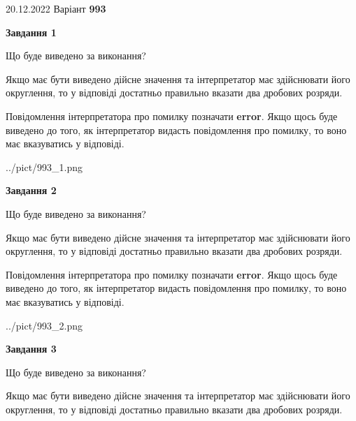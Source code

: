 \documentclass[12pt, ukrainian]{article}
\begin{document}
{20.12.2022 Варіант \No \textbf { 993 }\par}
{
\begin {Large}

{\begin {center}\textbf{Завдання 1}\end {center}}\par
Що буде виведено за виконання? \par

Якщо має бути виведено дійсне значення та інтерпретатор має здійснювати його округлення, 
то у відповіді достатньо правильно вказати два дробових розряди.

Повідомлення інтерпретатора про помилку позначати \textbf{error}.
Якщо щось буде виведено до того, як інтерпретатор видасть повідомлення про помилку, 
то воно має вказуватись у відповіді. \par

\begin{center}
	{../pict/993_1.png}
\end{center}
\newpage

{\begin {center}\textbf{Завдання 2}\end {center}}\par
Що буде виведено за виконання? \par

Якщо має бути виведено дійсне значення та інтерпретатор має здійснювати його округлення, 
то у відповіді достатньо правильно вказати два дробових розряди.

Повідомлення інтерпретатора про помилку позначати \textbf{error}.
Якщо щось буде виведено до того, як інтерпретатор видасть повідомлення про помилку, 
то воно має вказуватись у відповіді. \par

\begin{center}
	{../pict/993_2.png}
\end{center}
\newpage

{\begin {center}\textbf{Завдання 3}\end {center}}\par
Що буде виведено за виконання? \par

Якщо має бути виведено дійсне значення та інтерпретатор має здійснювати його округлення, 
то у відповіді достатньо правильно вказати два дробових розряди.


\end{Large}}
\end{document}
